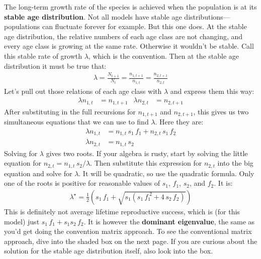\documentclass[10pt,reqno]{amsbook}
\newcommand{\bemph}[1]{{\textbf{\textcolor{bemphcol}{#1}}}}
\numberwithin{equation}{chapter}
\begin{document}
The long-term growth rate of the species is achieved when the population is at its \bemph{stable age distribution}. Not all models have stable age distributions---populations can fluctuate forever for example. But this one does. At the stable age distribution, the relative numbers of each age class are not changing, and every age class is growing at the same rate. Otherwise it wouldn't be stable. Call this stable rate of growth $\lambda$, which is the convention. Then at the stable age distribution it must be true that:
\begin{align*}
	\lambda = \frac{N_{t+1}}{N_t} = \frac{n_{1,t+1}}{n_{1,t}} = \frac{n_{2,t+1}}{n_{2,t}}
\end{align*}
Let's pull out those relations of each age class with $\lambda$ and express them this way:
\begin{align*}
	\lambda n_{1,t} &= n_{1,t+1} & \lambda n_{2,t} &= n_{2,t+1}
\end{align*}
After substituting in the full recursions for $n_{1,t+1}$ and $n_{2,t+1}$, this gives us two simultaneous equations that we can use to find $\lambda$. Here they are:
\begin{align*}
	\lambda n_{1,t} &= n_{1,t} \, s_1 \, f_1   + n_{2,t} \, s_1 \, f_2 \\
	\lambda n_{2,t} &= n_{1,t} \, s_2 
\end{align*}
Solving for $\lambda$ gives two roots. If your algebra is rusty, start by solving the little equation for $n_{2,t} = n_{1,t} \, s_2 / \lambda$. Then substitute this expression for $n_{2,t}$ into the big equation and solve for $\lambda$. It will be quadratic, so use the quadratic formula. Only one of the roots is positive for reasonable values of $s_1$, $f_1$, $s_2$, and $f_2$. It is:
\begin{align*}
	\lambda^{\!\star} = \frac{1}{2} \left( s_1 \, f_1  + \sqrt{s_1 ( s_1 \, f_1^{\;2} + 4 \, s_2 \, {f_2} )  } \right)
\end{align*}
This is definitely not average lifetime reproductive success, which is (for this model) just $s_1 \, f_1  +  s_1  s_2 \,  f_2 $. It is however the \bemph{dominant eigenvalue}, the same as you'd get doing the convention matrix approach. To see the conventional matrix approach, dive into the shaded box on the next page. If you are curious about the solution for the stable age distribution itself, also look into the box.
\end{document}
